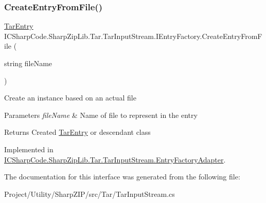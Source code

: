 \subsubsection{\texorpdfstring{Create\+Entry\+From\+File()}{CreateEntryFromFile()}}
{\footnotesize\ttfamily \hyperlink{class_i_c_sharp_code_1_1_sharp_zip_lib_1_1_tar_1_1_tar_entry}{Tar\+Entry} I\+C\+Sharp\+Code.\+Sharp\+Zip\+Lib.\+Tar.\+Tar\+Input\+Stream.\+I\+Entry\+Factory.\+Create\+Entry\+From\+File (\begin{DoxyParamCaption}\item[{string}]{file\+Name }\end{DoxyParamCaption})}



Create an instance based on an actual file 


\begin{DoxyParams}{Parameters}
{\em file\+Name} & Name of file to represent in the entry \\
\hline
\end{DoxyParams}
\begin{DoxyReturn}{Returns}
Created \hyperlink{class_i_c_sharp_code_1_1_sharp_zip_lib_1_1_tar_1_1_tar_entry}{Tar\+Entry} or descendant class 
\end{DoxyReturn}


Implemented in \hyperlink{class_i_c_sharp_code_1_1_sharp_zip_lib_1_1_tar_1_1_tar_input_stream_1_1_entry_factory_adapter_ac36b2a846d3148d82ebba5cc1db97ad7}{I\+C\+Sharp\+Code.\+Sharp\+Zip\+Lib.\+Tar.\+Tar\+Input\+Stream.\+Entry\+Factory\+Adapter}.



The documentation for this interface was generated from the following file\+:\begin{DoxyCompactItemize}
\item 
Project/\+Utility/\+Sharp\+Z\+I\+P/src/\+Tar/Tar\+Input\+Stream.\+cs\end{DoxyCompactItemize}
